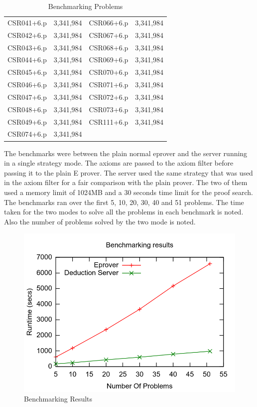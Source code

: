 \begin{table}[ht]
\begin{center}
\begin{tabular}{c|c||c|c}
      CSR041+6.p   & 3,341,984          & CSR066+6.p   & 3,341,984 \\
      CSR042+6.p   & 3,341,984          & CSR067+6.p   & 3,341,984 \\
      CSR043+6.p   & 3,341,984          & CSR068+6.p   & 3,341,984 \\
      CSR044+6.p   & 3,341,984          & CSR069+6.p   & 3,341,984 \\
      CSR045+6.p   & 3,341,984          & CSR070+6.p   & 3,341,984 \\
      CSR046+6.p   & 3,341,984          & CSR071+6.p   & 3,341,984 \\
      CSR047+6.p   & 3,341,984          & CSR072+6.p   & 3,341,984 \\
      CSR048+6.p   & 3,341,984          & CSR073+6.p   & 3,341,984 \\
      CSR049+6.p   & 3,341,984          & CSR111+6.p   & 3,341,984 \\
      CSR074+6.p   & 3,341,984          &              &           \\
      \bottomrule
    \end{tabular}
  \end{center}
\caption{Benchmarking Problems}
\label{Table:BenchmarkingProblems}
\end{table}

The benchmarks were between the plain normal eprover and the server running in a single strategy mode. The axioms are passed to the axiom filter before passing it to the plain E prover. The server used the same strategy that was used in the axiom filter for a fair comparison with the plain prover. The two of them used a memory limit of 1024MB and a 30 seconds time limit for the proof search. The benchmarks ran over the first 5, 10, 20, 30, 40 and 51 problems. The time taken for the two modes to solve all the problems in each benchmark is noted. Also the number of problems solved by the two mode is noted.

\begin{figure}[ht!]
  \centering
  \includegraphics[width=150mm]{graphics/BenchmarkingResults.png}
  \caption{Benchmarking Results\label{benchmarking_results}}
\end{figure}

